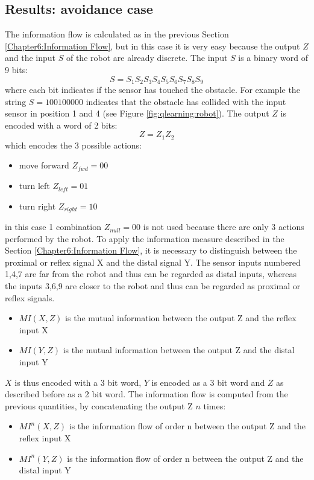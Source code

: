 \subsection{Results: avoidance case}
The information flow is calculated as in the previous Section \ref{Chapter6:Information Flow},
but in this case it is very easy because the output $Z$ and the input $S$ of the robot
are already discrete.
The input $S$ is a binary word of 9 bits:
\begin{equation}
S={S_1 S_2 S_3 S_4 S_5 S_6 S_7 S_8 S_9}  \label{eq:qlearn:S}
\end{equation}
where each bit indicates if the sensor has touched the obstacle.
For example the string $S={1 0 0 1 0 0 0 0 0}$ indicates that the obstacle has
collided with the input sensor in position 1 and 4 (see Figure \ref{fig:qlearning:robot}).
The output $Z$ is encoded with a word of 2 bits:
\begin{equation}
Z={Z_1 Z_2}   \label{eq:qlearn:Z}
\end{equation}
which encodes the 3 possible actions:
\begin{itemize}
 \item move forward $Z_{fwd}={0 0}$
 \item turn left    $Z_{left}={0 1}$
 \item turn right   $Z_{right}={1 0}$
\end{itemize}
in this case 1 combination $Z_{null}={0 0}$ is not used because there are
only 3 actions performed by the robot.
To apply the information measure described in the Section \ref{Chapter6:Information Flow},
it is necessary to distinguish between the proximal or reflex signal X and the
distal signal Y.
The sensor inputs numbered 1,4,7 are far from the robot and thus can be
regarded as distal inputs, whereas the inputs 3,6,9 are closer to the robot
and thus can be regarded as proximal or reflex signals.
\begin{itemize}
 \item $MI(X,Z)$ is the mutual information between the output Z and the reflex input X
 \item $MI(Y,Z)$ is the mutual information between the output Z and the distal input Y
\end{itemize}
$X$ is thus encoded with a 3 bit word, $Y$ is encoded as a 3 bit word and
$Z$ as described before as a 2 bit word.
The information flow is computed from the previous quantities, by concatenating
the output Z $n$ times:
\begin{itemize}
 \item $MI^n(X,Z)$ is the information flow of order n between the output Z and the reflex input X
 \item $MI^n(Y,Z)$ is the information flow of order n between the output Z and the distal input Y
\end{itemize}
